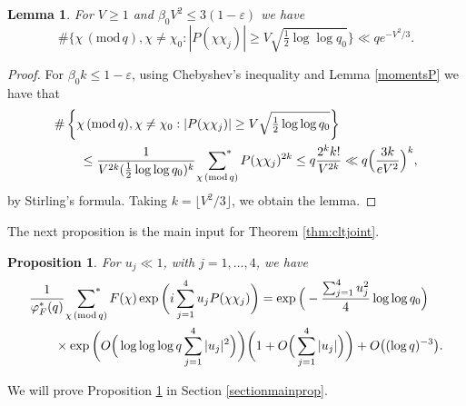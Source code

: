 \documentclass[12pt, reqno]{amsart}
\renewcommand{\pmod}[1]{\,(\mathrm{mod}\,#1)}
\newtheorem{lemma}[theorem]{Lemma}
\newtheorem{proposition}[theorem]{Proposition}
\numberwithin{equation}{section}
\numberwithin{theorem}{section}
\numberwithin{equation}{section}
\def\sumstar{\sideset{}{^*}\sum}
\begin{document}
\begin{lemma} \label{lem:largedev}
For $V \ge 1$ and $\beta_0V^2\leq 3(1-\varepsilon)$ we have
\[
\# \bigg\{ \chi \pmod q,\chi\ne\chi_0 : |P(\chi\chi_j)| \ge V \sqrt{\tfrac12 \log \log q_0} \bigg\} \ll q e^{-V^2/3}.
\]
\end{lemma}
\begin{proof}
For $\beta_0k \le 1-\varepsilon$, using Chebyshev's inequality and Lemma \ref{momentsP} we have that 
\begin{align*}
&\# \left\{ \chi \pmod q,\chi\ne\chi_0 : |P(\chi\chi_j)| \ge V \sqrt{\tfrac12 \log \log q_0} \right\}\\
&\qquad\le \frac{1}{V^{2k} (\frac12 \log \log q_0)^k} \ \sumstar_{\substack{\chi \pmod q}} P(\chi\chi_j)^{2k}\leq q \frac{2^kk!}{ V^{2k}} \ll q \Big( \frac{3k}{eV^2}\Big)^k,
\end{align*}
by Stirling's formula. Taking $k=\lfloor V^2/3 \rfloor$, we obtain the lemma.
\end{proof}

The next proposition is the main input for Theorem \ref{thm:cltjoint}.

\begin{proposition}\label{mainprop}
For $u_j\ll 1$, with $j=1,\ldots,4$, we have
\begin{align*}
 & \frac{1}{\varphi_F^{*}(q)} \ \sumstar_{\chi \pmod q} F(\chi)  
\exp\bigg(  i\sum_{j=1}^4 u_jP(\chi\chi_j)\bigg) = \exp \Big(  - \frac{\sum_{j=1}^4 u_j^2}{4} \log \log q_0 \Big)  \\
&\qquad \times   \exp \bigg( O \Big(  \log \log \log q \sum_{j=1}^4 |u_j|^2\Big) \bigg) \bigg(1 +O \Big(  \sum_{j=1}^4 |u_j|\Big) \bigg) + O \big(  (\log q)^{-3}\big).
\end{align*}
\end{proposition}

We will prove Proposition \ref{mainprop} in Section \ref{sectionmainprop}.
\end{document}
